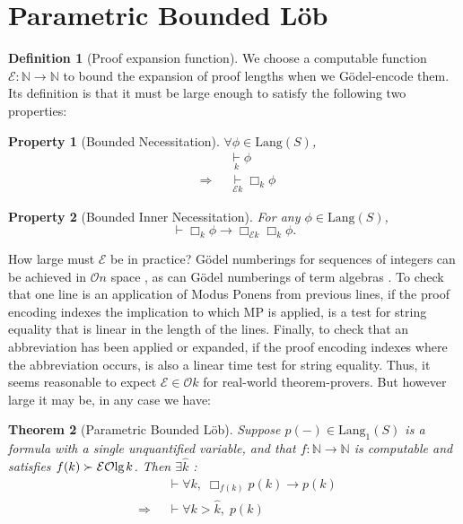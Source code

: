 \documentclass[onecolumn,authordate]{miri-tech-article}
\newtheorem{theorem}{Theorem}
\newtheorem{property}{Property}
\numberwithin{equation}{section}
\theoremstyle{definition}
\newtheorem{definition}[theorem]{Definition}
\newcommand{\NN}{\mathbb{N}}
\newcommand{\Ee}{\mathcal{E}}
\newcommand{\Oo}{\mathcal{O}}
\newcommand{\proves}[1]{\underset{#1}{\vdash}}
\newcommand{\bx}[1]{\Box_{#1}}
\newcommand{\Lang}{\mathrm{Lang}}
\renewcommand{\implies}{\rightarrow}
\newcommand{\Implies}{\;\;\Rightarrow\;\;}
\renewcommand{\to}{\rightarrow}
\renewcommand{\lg}{\mathrm{lg\hspace{0.3ex}}}
\renewcommand{\-}{^{-1}}
\begin{document}
\section{Parametric Bounded L\"{o}b}\label{sec:blob}

\begin{definition}[Proof expansion function]\label{def:E}We choose a computable function $\Ee:\NN\to\NN$ to bound the expansion of proof lengths when we G\"{o}del-encode them.  Its definition is that it must be large enough to satisfy the following two properties:
\end{definition}

\begin{property}[Bounded Necessitation]
$\forall \phi \in \Lang(S)$,
\begin{align}
             &\proves{k} \phi \\
\Implies &\proves{\Ee k} \bx{k} \phi
\end{align}
\end{property}

\begin{property}[Bounded Inner Necessitation]
For any $\phi \in \Lang(S)$,
$$\proves{} \bx{k}\phi \implies \bx{\Ee k}\bx{k}\phi.$$
\end{property}

\noindent {\bf Estimating $\Ee$.}  How large must $\Ee$ be in practice?  G\"{o}del numberings for sequences of integers can be achieved in $\Oo n$ space \citep{Tsai:2002}, as can G\"{o}del numberings of term algebras \citep{Tarau:2013}.  To check that one line is an application of Modus Ponens from previous lines, if the proof encoding indexes the implication to which MP is applied, is a test for string equality that is linear in the length of the lines.  Finally, to check that an abbreviation has been applied or expanded, if the proof encoding indexes where the abbreviation occurs, is also a linear time test for string equality.
Thus, it seems reasonable to expect $\Ee \in \Oo k$ for real-world theorem-provers.  But however large it may be, in any case we have:

\begin{theorem}[Parametric Bounded L\"{o}b]\label{thm:pblob}
Suppose $p(-)\in\Lang_1(S)$ is a formula with a single unquantified variable, and that $f:\NN \to \NN$ is computable and satisfies $f(k) \succ \Ee\Oo\lg k$.  Then $\exists\hat k$ :
\begin{align*}
             &\proves{} \forall k,\; \bx{f(k)}p(k) \implies p(k)\\
\Implies &\proves{} \forall k>\hat k, \; p(k)
\end{align*}
\end{theorem}
\end{document}
